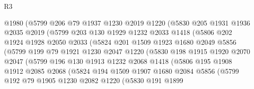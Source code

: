 \begin{lexlean}{R3}
\begin{coremodule}
                @1980
                (@5799
                  @206
                  @79
                  @1937
                  @1230
                  @2019
                  @1220
                  (@5830
                    @205
                    @1931
                    @1936
                    @2035
                    @2019
                    (@5799
                      @203
                      @130
                      @1929
                      @1232
                      @2033
                      @1418
                      (@5806
                        @202
                        @1924
                        @1928
                        @2050
                        @2033
                        (@5824
                          @201
                          @1509
                          @1923
                          @1680
                          @2049
                          @5856
                          (@5799
                            @199
                            @79
                            @1921
                            @1230
                            @2047
                            @1220
                            (@5830
                              @198
                              @1915
                              @1920
                              @2070
                              @2047
                              (@5799
                                @196
                                @130
                                @1913
                                @1232
                                @2068
                                @1418
                                (@5806
                                  @195
                                  @1908
                                  @1912
                                  @2085
                                  @2068
                                  (@5824
                                    @194
                                    @1509
                                    @1907
                                    @1680
                                    @2084
                                    @5856
                                    (@5799
                                      @192
                                      @79
                                      @1905
                                      @1230
                                      @2082
                                      @1220
                                      (@5830
                                        @191
                                        @1899

\end{coremodule}
\end{lexlean}
